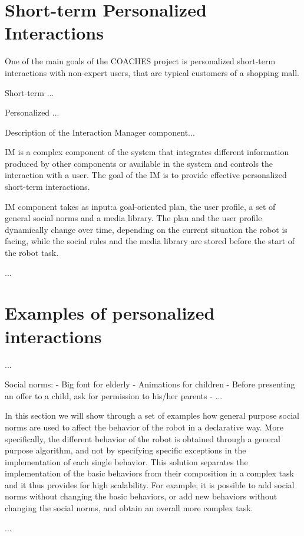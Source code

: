 \section{Short-term Personalized Interactions}

One of the main goals of the COACHES project is personalized short-term interactions with non-expert users, that are typical customers of a shopping mall.

Short-term ...

Personalized ...

Description of the Interaction Manager component...

IM is a complex component of the system that integrates different information produced by other components or available in the system and controls the interaction with a user.
The goal of the IM is to provide effective personalized short-term interactions.

IM component takes as input:a goal-oriented plan, the user profile, a set of general social norms and a media library. The plan and the user profile dynamically change over time, depending on the current situation the robot is facing, while the social rules and the media library are stored before the start of the robot task.

...

\section{Examples of personalized interactions}

...

Social norms:
- Big font for elderly
- Animations for children 
- Before presenting an offer to a child, ask for permission to his/her parents
- ...


In this section we will show through a set of examples how general purpose social norms are used to affect the behavior of the robot in a declarative way. More specifically, the different behavior of the robot is obtained through a general purpose algorithm, and not by specifying specific exceptions in the implementation of each single behavior.
This solution separates the implementation of the basic behaviors from their composition in a complex task and it thus provides for high scalability. For example, it is possible to add social norms without changing the basic behaviors, or add new behaviors without changing the social norms, and obtain an overall more complex task.


...








